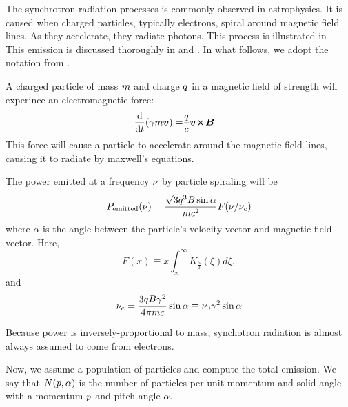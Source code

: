 The synchrotron radiation processes is commonly observed in
astrophysics. It is caused when charged particles, typically
electrons, spiral around magnetic field lines.  As they
accelerate, they radiate photons.  This process is illustrated in
.
This emission is discussed thoroughly in
\cite{blumenthal_1970a_bremsstrahlung-synchrotron} and
\cite{rybicki_1979a_radiative-processes}.
In what follows, we adopt the notation from
\cite{houck_2006a_models-nonthermal}.

A charged particle of 
mass $m$ and charge $q$ in a magnetic field
of strength 
\MagneticFieldVector
will experince an
electromagnetic force:
\begin{align}
  \frac{\text{d}}{\text{d}t} (\gamma m \boldsymbol{v}) = & \frac{q}{c} \boldsymbol{v}\!\boldsymbol{\times}\!\boldsymbol{B}
\end{align}
This force will cause a particle to accelerate around
the magnetic field lines, causing it
to radiate by maxwell's equations.

The power emitted at a frequency $\nu$ 
by particle spiraling will be
\begin{equation}
  \eqnlabel{power_emitted_particle_sync}
  \power_\text{emitted}(\frequency) = 
  \frac{\sqrt{3} \charge^3 B \sin\alpha}{\mass \speedoflight^2} F(\frequency/\frequency_c)
\end{equation}
where $\alpha$ is the angle between the particle's velocity vector and
magnetic field vector.
Here,
\begin{equation}
  F(x) \equiv x \int_x^\infty K_{\tfrac{5}{3}} (\xi) d\xi,
\end{equation}
and
\begin{equation}
  \eqnlabel{characteristic_freqnecy_synctotron}
\frequency_c = \frac{3q \MagneticField \gamma^2}{4\pi \mass \speedoflight} 
\sin\alpha \equiv \nu_0 \gamma^2 \sin\alpha
\end{equation}

Because power is inversely-proportional to mass, synchotron radiation
is almost always assumed to come from electrons.

Now, we assume a population of particles and compute the total
emission. We say that $N(p,\alpha)$ is the number of particles
per unit momentum and solid angle with a momentum $p$ and
pitch angle $\alpha$.

